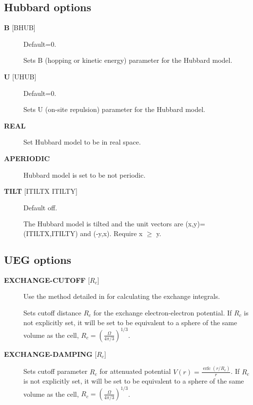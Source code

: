 \documentclass[openany,a4paper,10pt]{manual}
\begin{document}
\subsection{Hubbard options}
\begin{description}
\item[\textbf{B} {[}BHUB{]}]
Default=0.

Sets B (hopping or kinetic energy) parameter for the Hubbard model.

\item[\textbf{U} {[}UHUB{]}]
Default=0.

Sets U (on-site repulsion) parameter for the Hubbard model.

\item[\textbf{REAL}]
Set Hubbard model to be in real space.

\item[\textbf{APERIODIC}]
Hubbard model is set to be not periodic.

\item[\textbf{TILT} {[}ITILTX ITILTY{]}]
Default off.

The Hubbard model is tilted and the unit vectors are
(x,y)=(ITILTX,ITILTY) and (-y,x).  Require x $\ge$ y.

\end{description}


\subsection{UEG options}
\begin{description}
\item[\textbf{EXCHANGE-CUTOFF} {[}$R_c${]}]
Use the method detailed in \cite{AttenEx} for calculating the exchange
integrals.

Sets cutoff distance $R_c$ for the exchange electron-electron
potential.  If $R_c$ is not explicitly set, it will
be set to be equivalent to a sphere of the same volume as the cell,
$R_c=(\frac{\Omega}{4\pi/3})^{1/3}$.

\item[\textbf{EXCHANGE-DAMPING} {[}$R_c${]}]
Sets cutoff parameter $R_c$ for attenuated potential
$V(r)=\frac{\operatorname{erfc}(r/R_c)}{r}$.  If $R_c$ is not explicitly set,
it will be set to be equivalent to a sphere of the same volume as the cell,
$R_c=(\frac{\Omega}{4\pi/3})^{1/3}$.

\end{description}

\resetcurrentobjects
\end{document}

